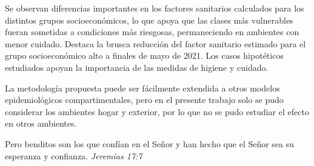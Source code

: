 \documentclass[upright, contnum]{umemoria}
\begin{document}
Se observan diferencias importantes en los factores sanitarios calculados para los distintos grupos socioeconómicos, lo que apoya que las clases más vulnerables fueran sometidas a condiciones más riesgosas, permaneciendo en ambientes con menor cuidado. Destaca la brusca reducción del factor sanitario estimado para el grupo socioeconómico alto a finales de mayo de 2021. Los casos hipotéticos estudiados apoyan la importancia de las medidas de higiene y cuidado.

La metodología propuesta puede ser fácilmente extendida a otros modelos epidemiológicos compartimentales, pero en el presente trabajo solo se pudo considerar los ambientes hogar y exterior, por lo que no se pudo estudiar el efecto en otros ambientes. %







\begin{dedicatoria}
Pero benditos son los que confían en el Señor\break
y han hecho que el Señor sea su esperanza y confianza.\break
\emph{Jeremías 17:7}
\end{dedicatoria}
 

\end{document}
